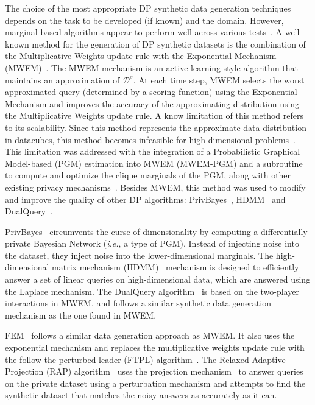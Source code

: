 \documentclass[parskip=full]{scrartcl}
\begin{document}
The choice of the most appropriate DP synthetic data generation techniques
depends on the task to be developed (if known) and the domain. However,
marginal-based algorithms appear to perform well across various
tests~\cite{tao2021benchmarking}. A well-known method for the generation of DP
synthetic datasets is the combination of the Multiplicative Weights update
rule with the Exponential Mechanism (MWEM)~\cite{hardt2012simple}. The MWEM
mechanism is an active learning-style algorithm that maintains an
approximation of $\mathcal{D}^s$. At each time step, MWEM selects the worst
approximated query (determined by a scoring function) using the Exponential
Mechanism and improves the accuracy of the approximating distribution using
the Multiplicative Weights update rule. A know limitation of this method
refers to its scalability. Since this method represents the approximate data
distribution in datacubes, this method becomes infeasible for high-dimensional
problems~\cite{mckenna2019graphical}. This limitation was addressed with the
integration of a Probabilistic Graphical Model-based (PGM) estimation into
MWEM (MWEM-PGM) and a subroutine to compute and optimize the clique marginals
of the PGM, along with other existing privacy
mechanisms~\cite{mckenna2019graphical}. Besides MWEM, this method was used to
modify and improve the quality of other DP algorithms:
PrivBayes~\cite{zhang2017privbayes}, HDMM~\cite{mckenna2018optimizing} and
DualQuery~\cite{gaboardi2014dual}.

PrivBayes~\cite{zhang2017privbayes} circumvents the curse of dimensionality by
computing a differentially private Bayesian Network (\textit{i.e.}, a type of
PGM). Instead of injecting noise into the dataset, they inject noise into the
lower-dimensional marginals. The high-dimensional matrix mechanism
(HDMM)~\cite{mckenna2018optimizing} mechanism is designed to efficiently
answer a set of linear queries on high-dimensional data, which are answered
using the Laplace mechanism. The DualQuery algorithm~\cite{gaboardi2014dual}
is based on the two-player interactions in MWEM, and follows a similar
synthetic data generation mechanism as the one found in MWEM\@.

FEM~\cite{vietri2020new} follows a similar data generation approach as MWEM\@.
It also uses the exponential mechanism and replaces the multiplicative weights
update rule with the follow-the-perturbed-leader (FTPL)
algorithm~\cite{kalai2005efficient}. The Relaxed Adaptive Projection (RAP)
algorithm~\cite{aydore2021differentially} uses the projection
mechanism~\cite{nikolov2013geometry} to answer queries on the private dataset
using a perturbation mechanism and attempts to find the synthetic dataset that
matches the noisy answers as accurately as it can.
\end{document}
